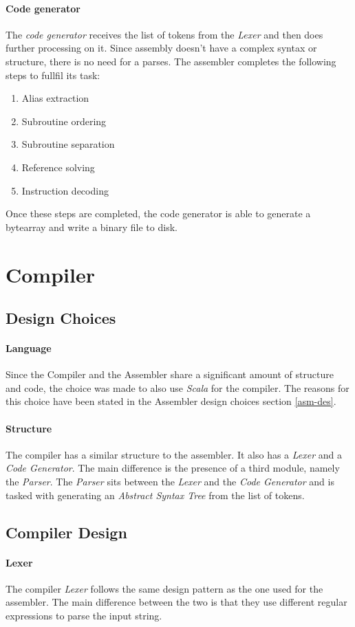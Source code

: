 \paragraph{Code generator}
The \emph{code generator} receives the list of tokens from the \emph{Lexer} and then does further
processing on it. Since assembly doesn't have a complex syntax or structure, there is no need
for a parses. The assembler completes the following steps to fullfil its task:
\begin{enumerate}
  \item Alias extraction
  \item Subroutine ordering
  \item Subroutine separation
  \item Reference solving
  \item Instruction decoding
\end{enumerate}
Once these steps are completed, the code generator is able to generate a bytearray and write a
binary file to disk.


\section{Compiler}
\subsection{Design Choices}
\paragraph{Language}
Since the Compiler and the Assembler share a significant amount of structure and code, the choice was made to also
use \emph{Scala} for the compiler. The reasons for this choice have been stated in the Assembler design choices
section \ref{asm-des}.
\paragraph{Structure}
The compiler has a similar structure to the assembler. It also has a \emph{Lexer} and a \emph{Code Generator}.
The main difference is the presence of a third module, namely the \emph{Parser}. The \emph{Parser} sits between
the \emph{Lexer} and the \emph{Code Generator} and is tasked with generating an \emph{Abstract Syntax Tree} from
the list of tokens.
\subsection{Compiler Design}
\paragraph{Lexer} The compiler \emph{Lexer} follows the same design pattern as the one used for the assembler.
The main difference between the two is that they use different regular expressions to parse the input string.

